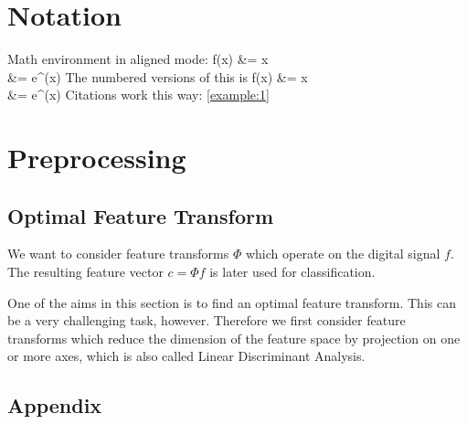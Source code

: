 \documentclass[oneside,a4paper]{article}
\title{\TITEL}
\author{Fin, Stan, Stefan, Jakob, Roland }
\begin{document}
\maketitle
\thispagestyle{empty}
\newpage
\tableofcontents
\thispagestyle{empty}
\newpage
\setcounter{page}{1}

\chapter{Notation}

Math environment in aligned mode:
\ba
f(x) &= x \\
	 &= e^{\log(x)}
\ea The numbered versions of this is
\ban
\label{example:1}
f(x) &= x \nonumber \\
	 &= e^{\log(x)}
\ean
Citations work this way: \eqref{example:1}



\chapter{Preprocessing}
\label{Preprocessing}

	\section{Optimal Feature Transform}
	\label{OFT}
	We want to consider feature transforms $\Phi$ which operate on the digital signal $f$. The resulting feature vector $c = \Phi f$ is later used for classification.
	
	One of the aims in this section is to find an optimal feature transform. This can be a very challenging task, however. 
	Therefore we first consider feature transforms which reduce the dimension of the feature space by projection on one or more axes, which is also called Linear Discriminant Analysis.
		\label{LDA}
		

%
%
%
\newpage

\appendix
{}
\section{Appendix}
\label{Appendix}

\newpage
\end{document}

